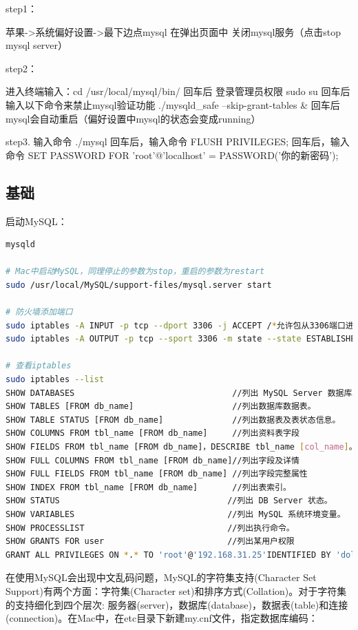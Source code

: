 \documentclass[letter]{book}
\begin{document}
step1：

苹果->系统偏好设置->最下边点mysql 在弹出页面中 关闭mysql服务（点击stop mysql server）

step2：

进入终端输入：cd /usr/local/mysql/bin/
回车后 登录管理员权限 sudo su
回车后输入以下命令来禁止mysql验证功能 ./mysqld\_safe --skip-grant-tables \&
回车后mysql会自动重启（偏好设置中mysql的状态会变成running）

step3. 
输入命令 ./mysql
回车后，输入命令 FLUSH PRIVILEGES; 
回车后，输入命令 SET PASSWORD FOR 'root'@'localhost' = PASSWORD('你的新密码');

\subsection{基础}

启动MySQL：

\begin{lstlisting}[language=Bash]
mysqld

# Mac中启动MySQL，同理停止的参数为stop，重启的参数为restart
sudo /usr/local/MySQL/support-files/mysql.server start

# 防火墙添加端口
sudo iptables -A INPUT -p tcp --dport 3306 -j ACCEPT /*允许包从3306端口进入*/
sudo iptables -A OUTPUT -p tcp --sport 3306 -m state --state ESTABLISHED -j ACCEPT /*允许从3306端口进入的包返回*/

# 查看iptables
sudo iptables --list
SHOW DATABASES                                //列出 MySQL Server 数据库。
SHOW TABLES [FROM db_name]                    //列出数据库数据表。
SHOW TABLE STATUS [FROM db_name]              //列出数据表及表状态信息。
SHOW COLUMNS FROM tbl_name [FROM db_name]     //列出资料表字段
SHOW FIELDS FROM tbl_name [FROM db_name]，DESCRIBE tbl_name [col_name]。
SHOW FULL COLUMNS FROM tbl_name [FROM db_name]//列出字段及详情
SHOW FULL FIELDS FROM tbl_name [FROM db_name] //列出字段完整属性
SHOW INDEX FROM tbl_name [FROM db_name]       //列出表索引。
SHOW STATUS                                  //列出 DB Server 状态。
SHOW VARIABLES                               //列出 MySQL 系统环境变量。
SHOW PROCESSLIST                             //列出执行命令。
SHOW GRANTS FOR user                         //列出某用户权限
GRANT ALL PRIVILEGES ON *.* TO 'root'@'192.168.31.25'IDENTIFIED BY 'dolphin' WITH GRANT OPTION;
\end{lstlisting}

在使用MySQL会出现中文乱码问题，MySQL的字符集支持(Character Set Support)有两个方面：字符集(Character set)和排序方式(Collation)。对于字符集的支持细化到四个层次: 服务器(server)，数据库(database)，数据表(table)和连接(connection)。在Mac中，在etc目录下新建my.cnf文件，指定数据库编码：
\end{document}

